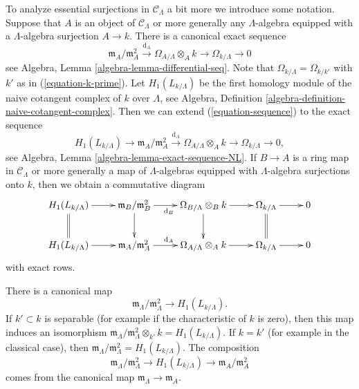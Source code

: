\noindent
To analyze essential surjections in $\mathcal{C}_\Lambda$ a bit more
we introduce some notation. Suppose that $A$ is an object
of $\mathcal{C}_\Lambda$ or more generally any $\Lambda$-algebra
equipped with a $\Lambda$-algebra surjection $A \to k$.
There is a canonical exact sequence
\begin{equation}
\label{equation-sequence}
\mathfrak m_A/\mathfrak m_A^2 \xrightarrow{\text{d}_A}
\Omega_{A/\Lambda} \otimes_A k \to
\Omega_{k/\Lambda} \to 0
\end{equation}
see
Algebra, Lemma \ref{algebra-lemma-differential-seq}.
Note that $\Omega_{k/\Lambda} = \Omega_{k/k'}$ with $k'$ as
in (\ref{equation-k-prime}). Let $H_1(L_{k/\Lambda})$
be the first homology module of the naive cotangent complex of $k$
over $\Lambda$, see
Algebra, Definition \ref{algebra-definition-naive-cotangent-complex}.
Then we can extend (\ref{equation-sequence})
to the exact sequence
\begin{equation}
\label{equation-sequence-extended}
H_1(L_{k/\Lambda}) \to
\mathfrak m_A/\mathfrak m_A^2 \xrightarrow{\text{d}_A}
\Omega_{A/\Lambda} \otimes_A k \to
\Omega_{k/\Lambda} \to 0,
\end{equation}
see
Algebra, Lemma \ref{algebra-lemma-exact-sequence-NL}.
If $B \to A$ is a ring map in $\mathcal{C}_\Lambda$
or more generally a map of $\Lambda$-algebras equipped
with $\Lambda$-algebra surjections onto $k$, then we obtain a
commutative diagram
\begin{equation}
\label{equation-sequence-functorial}
\vcenter{
\xymatrix{
H_1(L_{k/\Lambda}) \ar[r] \ar@{=}[d] &
\mathfrak m_B/\mathfrak m_B^2 \ar[r]_{\text{d}_B} \ar[d] &
\Omega_{B/\Lambda} \otimes_B k \ar[r] \ar[d] &
\Omega_{k/\Lambda} \ar[r] \ar@{=}[d] & 0 \\
H_1(L_{k/\Lambda}) \ar[r] &
\mathfrak m_A/\mathfrak m_A^2 \ar[r]^{\text{d}_A} &
\Omega_{A/\Lambda} \otimes_A k \ar[r] &
\Omega_{k/\Lambda} \ar[r] & 0
}
}
\end{equation}
with exact rows.

\begin{lemma}
\label{lemma-H1-separable-case}
There is a canonical map
$$
\mathfrak m_\Lambda/\mathfrak m_\Lambda^2 \longrightarrow H_1(L_{k/\Lambda}).
$$
If $k' \subset k$ is separable (for example if the characteristic
of $k$ is zero), then this map induces an isomorphism
$\mathfrak m_\Lambda/\mathfrak m_\Lambda^2 \otimes_{k'} k = H_1(L_{k/\Lambda})$.
If $k = k'$ (for example in the classical case), then
$\mathfrak m_\Lambda/\mathfrak m_\Lambda^2 = H_1(L_{k/\Lambda})$.
The composition
$$
\mathfrak m_\Lambda/\mathfrak m_\Lambda^2 \longrightarrow
H_1(L_{k/\Lambda}) \longrightarrow \mathfrak m_A/\mathfrak m_A^2
$$
comes from the canonical map $\mathfrak m_\Lambda \to \mathfrak m_A$.
\end{lemma}

